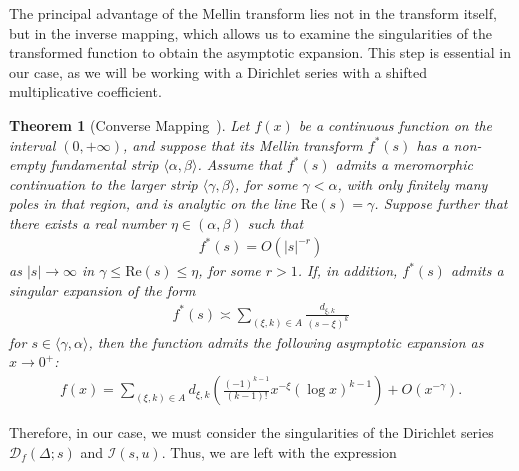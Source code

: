 \documentclass[12pt, oneside,reqno]{amsart}
\numberwithin{equation}{section}
\newtheorem{theorem}{Theorem}[section]
\begin{document}
\medskip

The principal advantage of the Mellin transform lies not in the transform itself, but in the inverse mapping, which allows us to examine the singularities of the transformed function to obtain the asymptotic expansion. This step is essential in our case, as we will be working with a Dirichlet series with a shifted multiplicative coefficient.

\begin{theorem}[Converse Mapping~\cite{flajoletetal}]\label{cmtheorem}
Let $f(x)$ be a continuous function on the interval $(0,+\infty)$, and suppose that its Mellin transform $f^{*}(s)$ has a non-empty fundamental strip $\langle\alpha,\beta\rangle$. Assume that $f^{*}(s)$ admits a meromorphic continuation to the larger strip $\langle\gamma,\beta\rangle$, for some $\gamma<\alpha$, with only finitely many poles in that region, and is analytic on the line $\mathrm{Re}(s)=\gamma$. Suppose further that there exists a real number $\eta\in(\alpha,\beta)$ such that
\begin{align}\label{cmcondition1}
f^{*}(s)=O(|s|^{-r})
\end{align}
as $|s|\to\infty$ in $\gamma\leq\mathrm{Re}(s)\leq \eta$, for some $r>1$. If, in addition, $f^*(s)$ admits a singular expansion of the form
\begin{align}\label{cmcondition2}
f^{*}(s)\asymp\sum_{(\xi,k)\in A}\frac{d_{\xi,k}}{(s-\xi)^k} \end{align}
for $s\in\langle\gamma,\alpha\rangle$, then the function admits the following asymptotic expansion as $x\to 0^{+}$:
\begin{align*}
f(x)
=\sum_{(\xi,k)\in A} d_{\xi,k}\left(\frac{(-1)^{k-1}}{(k-1)!}x^{-\xi}(\log x)^{k-1}\right)+O(x^{-\gamma}).
\end{align*}
\end{theorem}

\noindent
Therefore, in our case, we must consider the singularities of the Dirichlet series $\mathcal{D}_f(\Delta;s)$ and $\mathcal{I}(s,u)$. Thus, we are left with the expression
\end{document}
